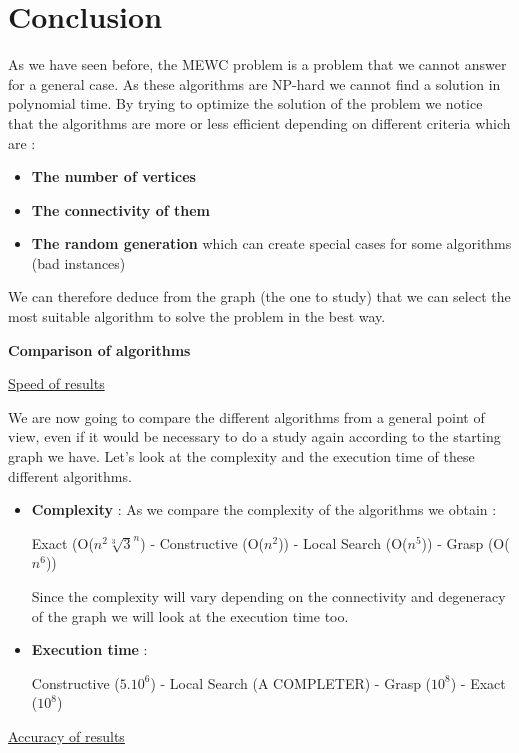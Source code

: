 
\section{Conclusion}

As we have seen before, the MEWC problem is a problem that we cannot answer for a general case. 
As these algorithms are NP-hard we cannot find a solution in polynomial time.
By trying to optimize the solution of the problem we notice that the algorithms are more or less efficient depending on different criteria which are :

\begin{itemize}
    \item \textbf{The number of vertices} 

    \item \textbf{The connectivity of them}

    \item \textbf{The random generation} which can create special cases for some algorithms (bad instances)
\end{itemize}

We can therefore deduce from the graph (the one to study) that we can select the most suitable algorithm to solve the problem in the best way.\bigskip

\large\textbf{Comparison of algorithms} \newline 

\underline{Speed of results}\bigskip

We are now going to compare the different algorithms from a general point of view, even if it would be necessary to do a study again according to the starting graph we have.
Let's look at the complexity and the execution time of these different algorithms.

\begin{itemize}
    \item \textbf{Complexity} : As we compare the complexity of the algorithms we obtain : \bigskip
    
Exact (O($n^2\sqrt[3]{3}^n$) - Constructive (O($n^2$)) - Local Search (O($n^5$)) - Grasp (O($n^6$)) \bigskip
    
    Since the complexity will vary depending on the connectivity and degeneracy of the graph we will look at the execution time too.
    
    \item \textbf{Execution time} : \bigskip
    
 Constructive ($5.10^6$) -  Local Search (A COMPLETER) - Grasp ($10^8$) - Exact (\thicksim $10^8$) 
\end{itemize}
\underline{Accuracy of results}\bigskip 

